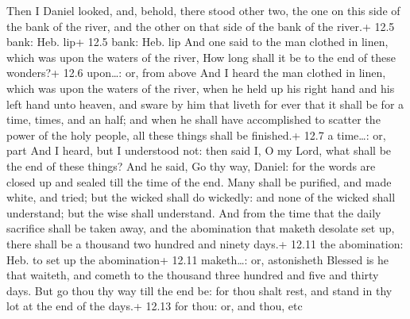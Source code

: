  Then I Daniel looked, and, behold, there stood other two,
the one on this side of the bank of the river, and the other on that
side of the bank of the river.+ 12.5 bank: Heb. lip+ 12.5 bank: Heb. lip
 And one said to the man clothed in linen, which was upon
the waters of the river, How long shall it be to the end of these
wonders?+ 12.6 upon\ldots: or, from above  And I heard the
man clothed in linen, which was upon the waters of the river, when he
held up his right hand and his left hand unto heaven, and sware by him
that liveth for ever that it shall be for a time, times, and an half;
and when he shall have accomplished to scatter the power of the holy
people, all these things shall be finished.+ 12.7 a time\ldots: or, part
 And I heard, but I understood not: then said I, O my Lord,
what shall be the end of these things?  And he said, Go thy
way, Daniel: for the words are closed up and sealed till the time of the
end.  Many shall be purified, and made white, and tried;
but the wicked shall do wickedly: and none of the wicked shall
understand; but the wise shall understand.  And from the
time that the daily sacrifice shall be taken away, and the abomination
that maketh desolate set up, there shall be a thousand two hundred and
ninety days.+ 12.11 the abomination: Heb. to set up the abomination+
12.11 maketh\ldots: or, astonisheth  Blessed is he that
waiteth, and cometh to the thousand three hundred and five and thirty
days.  But go thou thy way till the end be: for thou shalt
rest, and stand in thy lot at the end of the days.+ 12.13 for thou: or,
and thou, etc
